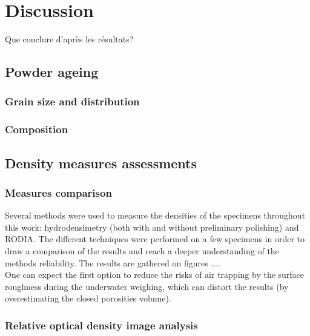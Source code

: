 \chapter{Discussion}
\label{Chap5}
Que conclure d'après les résultats?
\section{Powder ageing}
\subsection{Grain size and distribution}


\subsection{Composition}

\section{Density measures assessments}

\subsection{Measures comparison}

Several methods were used to measure the densities of the specimens throughout this work: hydrodensimetry (both with and without preliminary polishing) and RODIA. The different techniques were performed on a few specimens in order to draw a comparison of the results and reach a deeper understanding of the methods reliability. The results are gathered on figures ....\\

One can expect the first option to reduce the risks of air trapping by the surface roughness during the underwater weighing, which can distort the results (by overestimating the closed porosities volume). %


\subsection{Relative optical density image analysis}
\label{DRODIA}


